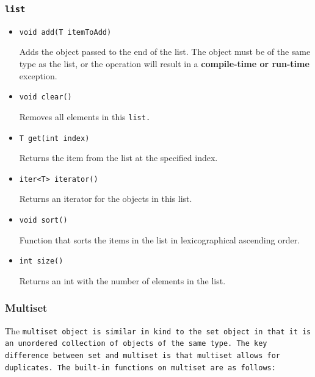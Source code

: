 \documentclass{article}
\begin{document}

\subsubsection{\tt list \rm} %
\label{ssub:list}

\begin{itemize}

\item[] \tt void add(T itemToAdd) \rm

Adds the object passed to the end of the list. The object must be of the same
type as the list, or the operation will result in a \textbf{compile-time or
run-time} exception.

\item[] \tt void clear() \rm

Removes all elements in this \tt list\rm.

\item[] \tt T get(int index) \rm

Returns the item from the list at the specified index.

\item[] \tt iter<T> iterator() \rm

Returns an iterator for the objects in this list.


\item[] \tt void sort() \rm

Function that sorts the items in the list in lexicographical ascending order.

\item[] \tt int size() \rm

Returns an int with the number of elements in the list.

\end{itemize}



\subsubsection{Multiset} %
\label{ssub:multiset}

The \tt multiset \rm object is similar in kind to the \tt set \rm object in that
it is an unordered collection of objects of the same type. The key difference
between \tt set \rm and \tt multiset \rm is that \tt multiset \rm allows for
duplicates. The built-in functions on \tt multiset \rm are as follows:
\end{document}

